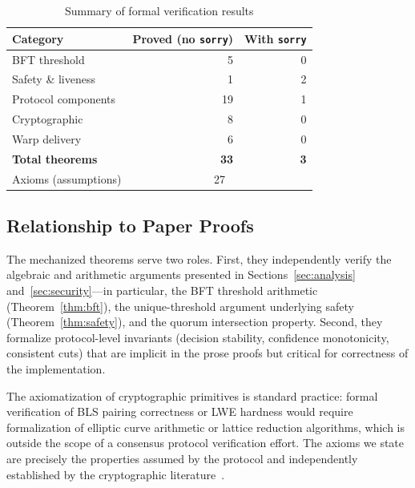 \begin{table}[h]
\centering
\caption{Summary of formal verification results}
\label{tab:formal-summary}
\begin{tabular}{@{}lrr@{}}
\toprule
Category & Proved (no \texttt{sorry}) & With \texttt{sorry} \\
\midrule
BFT threshold & 5 & 0 \\
Safety \& liveness & 1 & 2 \\
Protocol components & 19 & 1 \\
Cryptographic & 8 & 0 \\
Warp delivery & 6 & 0 \\
\midrule
\textbf{Total theorems} & \textbf{33} & \textbf{3} \\
Axioms (assumptions) & \multicolumn{2}{c}{27} \\
\bottomrule
\end{tabular}
\end{table}

\subsection{Relationship to Paper Proofs}

The mechanized theorems serve two roles. First, they independently verify the
algebraic and arithmetic arguments presented in Sections~\ref{sec:analysis}
and~\ref{sec:security}---in particular, the BFT threshold arithmetic
(Theorem~\ref{thm:bft}), the unique-threshold argument underlying safety
(Theorem~\ref{thm:safety}), and the quorum intersection property. Second, they
formalize protocol-level invariants (decision stability, confidence monotonicity,
consistent cuts) that are implicit in the prose proofs but critical for correctness
of the implementation.

The axiomatization of cryptographic primitives is standard practice: formal
verification of BLS pairing correctness or LWE hardness would require formalization
of elliptic curve arithmetic or lattice reduction algorithms, which is outside the
scope of a consensus protocol verification effort. The axioms we state are precisely
the properties assumed by the protocol and independently established by the
cryptographic literature~\cite{boneh2001short,komlo2020frost,ducas2018crystals}.

